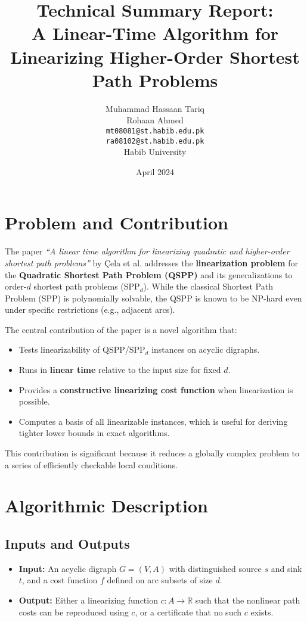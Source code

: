 \documentclass[12pt]{article}
\title{Technical Summary Report: \\ A Linear-Time Algorithm for Linearizing Higher-Order Shortest Path Problems}
\author{Muhammad Hassaan Tariq \\ Rohaan Ahmed\\
\texttt{mt08081@st.habib.edu.pk}\\
\texttt{ra08102@st.habib.edu.pk}\\
Habib University}
\date{April 2024}
\begin{document}
\maketitle

\section{Problem and Contribution}

The paper \textit{“A linear time algorithm for linearizing quadratic and higher-order shortest path problems”} by Çela et al. addresses the \textbf{linearization problem} for the \textbf{Quadratic Shortest Path Problem (QSPP)} and its generalizations to order-$d$ shortest path problems (SPP$_d$). While the classical Shortest Path Problem (SPP) is polynomially solvable, the QSPP is known to be NP-hard even under specific restrictions (e.g., adjacent arcs).

The central contribution of the paper is a novel algorithm that:
\begin{itemize}[itemsep=2pt]
    \item Tests linearizability of QSPP/SPP$_d$ instances on acyclic digraphs.
    \item Runs in \textbf{linear time} relative to the input size for fixed $d$.
    \item Provides a \textbf{constructive linearizing cost function} when linearization is possible.
    \item Computes a basis of all linearizable instances, which is useful for deriving tighter lower bounds in exact algorithms.
\end{itemize}

This contribution is significant because it reduces a globally complex problem to a series of efficiently checkable local conditions.

\section{Algorithmic Description}

\subsection*{Inputs and Outputs}
\begin{itemize}
    \item \textbf{Input:} An acyclic digraph $G = (V, A)$ with distinguished source $s$ and sink $t$, and a cost function $f$ defined on arc subsets of size $d$.
    \item \textbf{Output:} Either a linearizing function $c : A \to \mathbb{R}$ such that the nonlinear path costs can be reproduced using $c$, or a certificate that no such $c$ exists.
\end{itemize}
\end{document}
